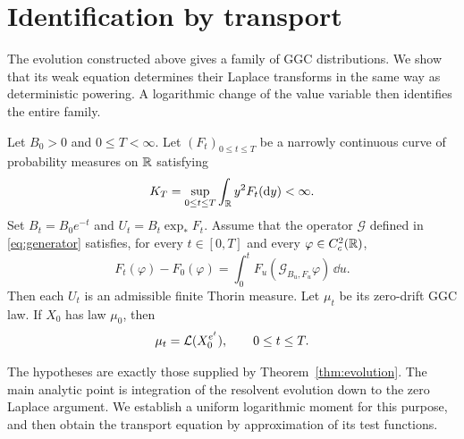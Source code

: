 \section{Identification by transport}
\label{sec:identification}

The evolution constructed above gives a family of GGC distributions.
We show that its weak equation determines their Laplace transforms in the same way as deterministic powering.
A logarithmic change of the value variable then identifies the entire family.

\begin{theorem}
\label{thm:identification}
Let $B_0>0$ and $0\le T<\infty$.
Let $(F_t)_{0\le t\le T}$ be a narrowly continuous curve of probability measures on $\mathbb R$ satisfying
\begin{equation}
 K_T=\sup_{0\le t\le T}\int_\mathbb R y^2F_t(\mathop{}\!\mathrm d y)<\infty.
 \label{eq:id-assumptions}
\end{equation}
Set $B_t=B_0e^{-t}$ and $U_t=B_t\exp_*F_t$.
Assume that the operator $\mathcal G$ defined in \eqref{eq:generator} satisfies, for every $t\in[0,T]$ and every $\varphi\in C_c^2(\mathbb R)$,
\begin{equation}
 F_t(\varphi)-F_0(\varphi)
 =\int_0^t F_u(\mathcal G_{B_u,F_u}\varphi)\,\dd u.
 \label{eq:id-weak-rate}
\end{equation}
Then each $U_t$ is an admissible finite Thorin measure.
Let $\mu_t$ be its zero-drift GGC law.
If $X_0$ has law $\mu_0$, then
\begin{equation}
 \mu_t=\mathcal L(X_0^{e^t}),\qquad 0\le t\le T.
 \label{eq:id-conclusion}
\end{equation}
\end{theorem}

The hypotheses are exactly those supplied by Theorem~\ref{thm:evolution}.
The main analytic point is integration of the resolvent evolution down to the zero Laplace argument.
We establish a uniform logarithmic moment for this purpose, and then obtain the transport equation by approximation of its test functions.

